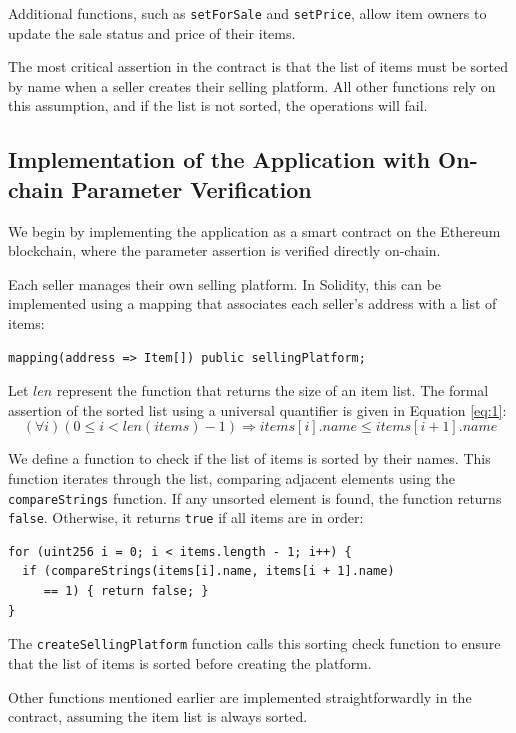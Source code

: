 \documentclass[runningheads]{llncs}
\begin{document}
Additional functions, such as \texttt{setForSale} and \texttt{setPrice}, allow item owners to update the sale status and price of their items.

The most critical assertion in the contract is that the list of items must be sorted by name when a seller creates their selling platform. All other functions rely on this assumption, and if the list is not sorted, the operations will fail.
\subsection{Implementation of the Application with On-chain Parameter Verification}
We begin by implementing the application as a smart contract on the Ethereum blockchain, where the parameter assertion is verified directly on-chain.

Each seller manages their own selling platform. In Solidity, this can be implemented using a mapping that associates each seller's address with a list of items:
\begin{lstlisting}[numbers=none]
mapping(address => Item[]) public sellingPlatform;
\end{lstlisting}

Let \( len \) represent the function that returns the size of an item list. The formal assertion of the sorted list using a universal quantifier is given in Equation \ref{eq:1}:
\[
(\forall i) (0 \leq i < len(items) - 1) \Rightarrow items[i].name \leq items[i+1].name
\]

We define a function to check if the list of items is sorted by their names. This function iterates through the list, comparing adjacent elements using the \texttt{compareStrings} function. If any unsorted element is found, the function returns \texttt{false}. Otherwise, it returns \texttt{true} if all items are in order:
\begin{lstlisting}[numbers=none]
for (uint256 i = 0; i < items.length - 1; i++) {
  if (compareStrings(items[i].name, items[i + 1].name) 
     == 1) { return false; }
}
\end{lstlisting}

The \texttt{createSellingPlatform} function calls this sorting check function to ensure that the list of items is sorted before creating the platform.

Other functions mentioned earlier are implemented straightforwardly in the contract, assuming the item list is always sorted.


\end{document}
